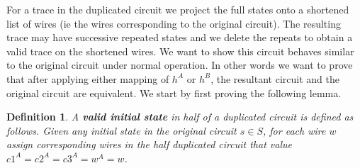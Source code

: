 \documentclass{article}
\newtheorem*{definition}{Definition}
\begin{document}
For a trace in the duplicated circuit we project the full states onto a shortened list of wires (ie the wires corresponding to the original circuit). The resulting trace may have successive repeated states and we delete the repeats to obtain a valid trace on the shortened wires.  %
\newline
We want to show this circuit behaves similar to the original circuit under normal operation.  In other words we want to prove that after applying either mapping of $h^A$ or $h^B$, the resultant circuit and the original circuit are equivalent.  We start by first proving the following lemma.

\begin{definition} A \textbf{valid initial state} in half of a duplicated circuit is defined as follows.  Given any initial state in the original circuit $s \in S$, for each wire $w$ assign corresponding wires in the half duplicated circuit that value $c1^A=c2^A=c3^A=w^A=w$.
\end{definition}
\end{document}
